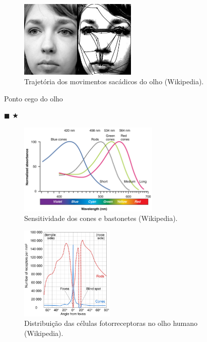 \begin{frame}[allowframebreaks]
   \framebreak

   \begin{figure}[h]
   \centering
   \includegraphics[width=0.5\textwidth]{images/szakkad.jpg}
   \caption{Trajetória dos movimentos sacádicos do olho (Wikipedia).}\label{fig-szakkad}
   \end{figure}

   \framebreak

   Ponto cego do olho

   \vspace{8ex}
   \begin{center}
   \begin{huge}
   $\blacksquare$ \hspace{3cm} $\bigstar$
   \end{huge}
   \end{center}

   \framebreak

   \begin{figure}[h]
   \centering
   \includegraphics[width=0.6\textwidth]{images/color_sensitivity.jpg}
   \caption{Sensitividade dos cones e bastonetes (Wikipedia).}\label{fig-sensitividade}
   \end{figure}

   \framebreak

   \begin{figure}[h]
   \centering
   \includegraphics[width=0.4\textwidth]{images/photoreceptor-distribution.pdf}
   \caption{Distribuição das células fotorreceptoras no olho humano (Wikipedia).}\label{fig-photoreceptor-distribution}
   \end{figure}

\end{frame}
